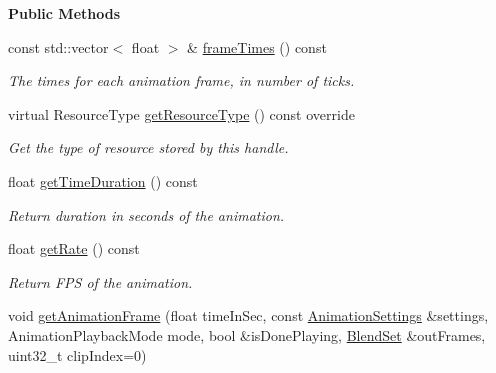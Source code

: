 \begin{Indent}\textbf{ Public Methods}\par
\begin{DoxyCompactItemize}
\item 
\mbox{\label{classrev_1_1_animation_a138ece8cd4f88af57d56969d734ba964}} 
const std\+::vector$<$ float $>$ \& \mbox{\hyperlink{classrev_1_1_animation_a138ece8cd4f88af57d56969d734ba964}{frame\+Times}} () const
\begin{DoxyCompactList}\small\item\em The times for each animation frame, in number of ticks. \end{DoxyCompactList}\item 
\mbox{\label{classrev_1_1_animation_a2b1dd3bdf5ae52f7887fff3c57cde32c}} 
virtual Resource\+Type \mbox{\hyperlink{classrev_1_1_animation_a2b1dd3bdf5ae52f7887fff3c57cde32c}{get\+Resource\+Type}} () const override
\begin{DoxyCompactList}\small\item\em Get the type of resource stored by this handle. \end{DoxyCompactList}\item 
\mbox{\label{classrev_1_1_animation_a48425a721bc28ff38a6767d6f28fadad}} 
float \mbox{\hyperlink{classrev_1_1_animation_a48425a721bc28ff38a6767d6f28fadad}{get\+Time\+Duration}} () const
\begin{DoxyCompactList}\small\item\em Return duration in seconds of the animation. \end{DoxyCompactList}\item 
\mbox{\label{classrev_1_1_animation_a01a60150390cb890290201a86b5341c7}} 
float \mbox{\hyperlink{classrev_1_1_animation_a01a60150390cb890290201a86b5341c7}{get\+Rate}} () const
\begin{DoxyCompactList}\small\item\em Return F\+PS of the animation. \end{DoxyCompactList}\item 
void \mbox{\hyperlink{classrev_1_1_animation_a11aab8f1b8487fbdb895e9855f7230e2}{get\+Animation\+Frame}} (float time\+In\+Sec, const \mbox{\hyperlink{structrev_1_1_animation_settings}{Animation\+Settings}} \&settings, Animation\+Playback\+Mode mode, bool \&is\+Done\+Playing, \mbox{\hyperlink{structrev_1_1_blend_set}{Blend\+Set}} \&out\+Frames, uint32\+\_\+t clip\+Index=0)

\end{DoxyCompactItemize}
\end{Indent}
